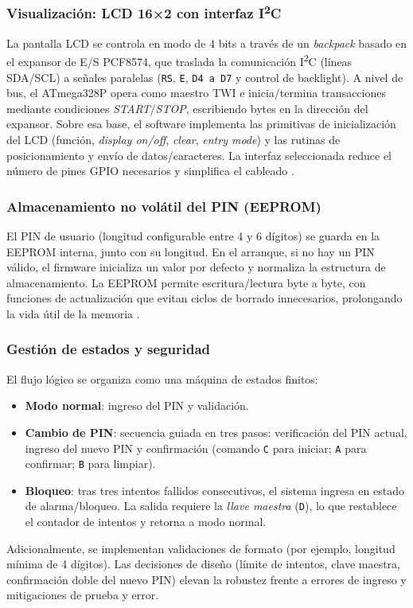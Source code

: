 \subsubsection{Visualización: LCD 16×2 con interfaz I\textsuperscript{2}C}
La pantalla LCD se controla en modo de 4 bits a través de un \textit{backpack} basado en el expansor de E/S PCF8574, que traslada la comunicación I\textsuperscript{2}C (líneas SDA/SCL) a señales paralelas (\texttt{RS}, \texttt{E}, \texttt{D4 a D7} y control de backlight). A nivel de bus, el ATmega328P opera como maestro TWI e inicia/termina transacciones mediante condiciones \textit{START}/\textit{STOP}, escribiendo bytes en la dirección del expansor. Sobre esa base, el software implementa las primitivas de inicialización del LCD (función, \textit{display on/off}, \textit{clear}, \textit{entry mode}) y las rutinas de posicionamiento y envío de datos/caracteres. La interfaz seleccionada reduce el número de pines GPIO necesarios y simplifica el cableado \cite{lcd_16x2_i2c_datasheet}.

\subsubsection{Almacenamiento no volátil del PIN (EEPROM)}
El PIN de usuario (longitud configurable entre 4 y 6 dígitos) se guarda en la EEPROM interna, junto con su longitud. En el arranque, si no hay un PIN válido, el firmware inicializa un valor por defecto y normaliza la estructura de almacenamiento. La EEPROM permite escritura/lectura byte a byte, con funciones de actualización que evitan ciclos de borrado innecesarios, prolongando la vida útil de la memoria \cite{atmega328p_datasheet}.

\subsubsection{Gestión de estados y seguridad}
El flujo lógico se organiza como una máquina de estados finitos:
\begin{itemize}
    \item \textbf{Modo normal}: ingreso del PIN y validación.
    \item \textbf{Cambio de PIN}: secuencia guiada en tres pasos: verificación del PIN actual, ingreso del nuevo PIN y confirmación (comando \texttt{C} para iniciar; \texttt{A} para confirmar; \texttt{B} para limpiar).
    \item \textbf{Bloqueo}: tras tres intentos fallidos consecutivos, el sistema ingresa en estado de alarma/bloqueo. La salida requiere la \textit{llave maestra} (\texttt{D}), lo que restablece el contador de intentos y retorna a modo normal.
\end{itemize}
Adicionalmente, se implementan validaciones de formato (por ejemplo, longitud mínima de 4 dígitos). Las decisiones de diseño (límite de intentos, clave maestra, confirmación doble del nuevo PIN) elevan la robustez frente a errores de ingreso y mitigaciones de prueba y error.

